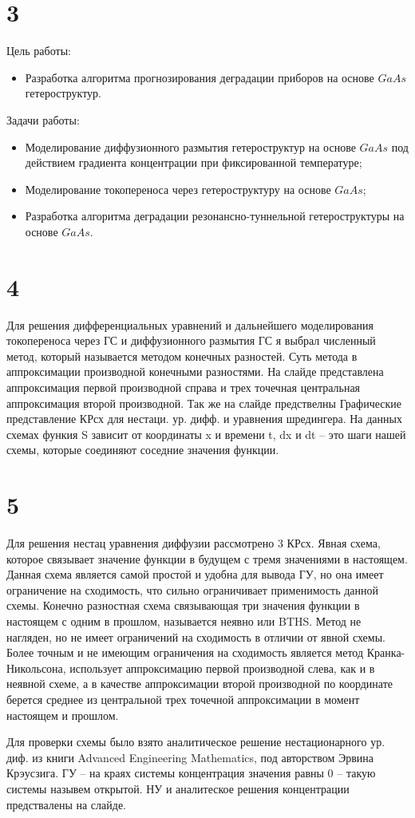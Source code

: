 \documentclass[utf8, 14pt]{G7-32}
\begin{document}
\section{3}
Цель работы:
\begin{itemize}
    \item Разработка алгоритма прогнозирования деградации приборов на основе $GaAs$ гетероструктур.
\end{itemize}
Задачи работы:
\begin{itemize}
    \item Моделирование диффузионного размытия гетероструктур на основе $GaAs$ под действием градиента концентрации при фиксированной температуре;
    \item Моделирование токопереноса через гетероструктуру на основе $GaAs$;
    \item Разработка алгоритма деградации резонансно-туннельной гетероструктуры на основе $GaAs$.
\end{itemize}

\section{4}
Для решения дифференциальных уравнений и дальнейшего моделирования токопереноса через ГС и диффузионного размытия ГС я выбрал численный метод, который называется методом конечных разностей. Суть метода в аппроксимации производной конечными разностями. На слайде представлена аппроксимация первой производной справа и трех точечная центральная аппроксимация второй производной. Так же на слайде предствелны Графические представление КРсх для нестаци. ур. дифф. и уравнения шредингера. На данных схемах функия S зависит от координаты x и времени t, dx  и dt -- это шаги нашей схемы, которые соединяют соседние значения функции.

\section{5}
Для решения нестац уравнения диффузии рассмотрено 3 КРсх. Явная схема, которое связывает значение функции в будущем с тремя значениями в настоящем. Данная схема является самой простой и удобна для вывода ГУ, но она имеет ограничение на сходимость, что сильно ограничивает применимость данной схемы.
Конечно разностная схема связывающая три значения функции в настоящем с одним в прошлом, называется неявно или BTHS. Метод не нагляден, но не имеет ограничений на сходимость в отличии от явной схемы.
Более точным и не имеющим ограничения на сходимость является метод Кранка-Никольсона, использует аппроксимацию первой производной слева, как и в неявной схеме, а в качестве аппроксимации второй производной по координате берется среднее из центральной трех точечной аппроксимации в момент настоящем и прошлом.

Для проверки схемы было взято аналитическое решение нестационарного ур. диф. из книги Advanced Engineering Mathematics, под авторством Эрвина Крэусзига. ГУ -- на краях системы концентрация значения равны 0 -- такую системы назывем открытой. НУ и аналитеское решения концентрации предствалены на слайде.
\end{document}
